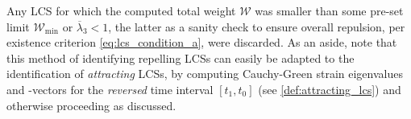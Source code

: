 Any LCS for which the computed total weight
$\mathcal{W}$ was smaller than some pre-set limit $\mathcal{W}_{\min}$ or
$\overline{\lambda}_{3} < 1$, the latter as a sanity
check to ensure overall repulsion, per existence criterion
\eqref{eq:lcs_condition_a}, were discarded. As an aside, note that this method
of identifying repelling LCSs can easily be adapted to the identification of
\emph{attracting} LCSs, by computing Cauchy-Green strain eigenvalues and
-vectors for the \emph{reversed} time interval $[t_{1},t_{0}]$ (see
\cref{def:attracting_lcs}) and otherwise proceeding as discussed.



